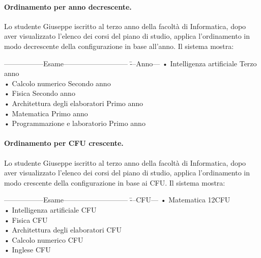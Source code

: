 \paragraph{Ordinamento per anno decrescente.}
Lo studente Giuseppe iscritto al terzo anno della facoltà di Informatica, dopo aver visualizzato l'elenco dei corsi del piano di studio, applica l'ordinamento in modo decrescente della configurazione in base all’anno. Il sistema mostra:
\begin{tabbing}
	\hspace{1cm}-----------------Esame--------------------------- \= ---Anno--- \kill
	\hspace{1cm} • Intelligenza artificiale \> Terzo anno\\
	\hspace{1cm} • Calcolo numerico \> Secondo anno\\
	\hspace{1cm} • Fisica \> Secondo anno\\
	\hspace{1cm} • Architettura degli elaboratori \> Primo anno\\
	\hspace{1cm} • Matematica  \>Primo anno\\
	\hspace{1cm} • Programmazione e laboratorio \> Primo anno\\
\end{tabbing}


\paragraph{Ordinamento per CFU crescente.}
Lo studente Giuseppe iscritto al terzo anno della facoltà di Informatica, dopo aver visualizzato l'elenco dei corsi del piano di studio, applica l'ordinamento in modo crescente della configurazione in base ai CFU. Il sistema mostra:
\begin{tabbing}
	\hspace{1cm}-----------------Esame--------------------------- \= ---CFU--- \kill
	\hspace{1cm} • Matematica \> 12CFU\\
	\hspace{1cm} • Intelligenza artificiale  CFU\\
	\hspace{1cm} • Fisica  CFU\\
	\hspace{1cm} • Architettura degli elaboratori  CFU\\
	\hspace{1cm} • Calcolo numerico   CFU\\
	\hspace{1cm} • Inglese  CFU\\
\end{tabbing}


